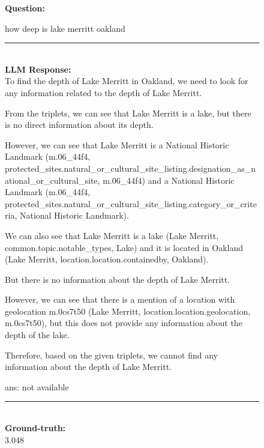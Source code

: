 \begin{figure}
\begin{tcolorbox}[colback=gray!5!white, colframe=gray!75!black, title=WebQSP-WebQTest-386]
\scriptsize

\textbf{Question:}\\
\raggedright how deep is lake merritt oakland

\rule{\linewidth}{0.4pt}
\\
\textbf{LLM Response:}\\
To find the depth of Lake Merritt in Oakland, we need to look for any information related to the depth of Lake Merritt.



From the triplets, we can see that Lake Merritt is a lake, but there is no direct information about its depth.



However, we can see that Lake Merritt is a National Historic Landmark (m.06\_44f4, protected\_sites.natural\_or\_cultural\_site\_listing.designation\_as\_national\_or\_cultural\_site, m.06\_44f4) and a National Historic Landmark (m.06\_44f4, protected\_sites.natural\_or\_cultural\_site\_listing.category\_or\_criteria, National Historic Landmark).



We can also see that Lake Merritt is a lake (Lake Merritt, common.topic.notable\_types, Lake) and it is located in Oakland (Lake Merritt, location.location.containedby, Oakland).



But there is no information about the depth of Lake Merritt.



However, we can see that there is a mention of a location with geolocation m.0cs7t50 (Lake Merritt, location.location.geolocation, m.0cs7t50), but this does not provide any information about the depth of the lake.



Therefore, based on the given triplets, we cannot find any information about the depth of Lake Merritt.



ans: not available

\rule{\linewidth}{0.4pt}
\\
\textbf{Ground-truth:}\\
3.048

\end{tcolorbox}
\end{figure}


